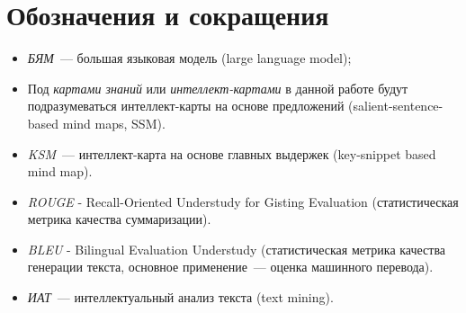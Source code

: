 \documentclass[12pt]{article}
\begin{document}












\newpage
\section*{Обозначения и сокращения}
\begin{itemize}
    \item \textit{БЯМ}~--- большая языковая модель (large language model);
    
    \item Под \textit{картами знаний} или \textit{интеллект-картами} в данной работе будут подразумеваться интеллект-карты на основе предложений (salient-sentence-based mind maps, SSM).

    \item \textit{KSM}~--- интеллект-карта на основе главных выдержек (key-snippet based mind map).

    \item \textit{ROUGE} - Recall-Oriented Understudy for Gisting Evaluation (статистическая метрика качества суммаризации).

    \item \textit{BLEU} - Bilingual Evaluation Understudy (статистическая метрика качества генерации текста, основное применение~--- оценка машинного перевода).

    \item \textit{ИАТ}~--- интеллектуальный анализ текста (text mining).
\end{itemize}
\end{document}
